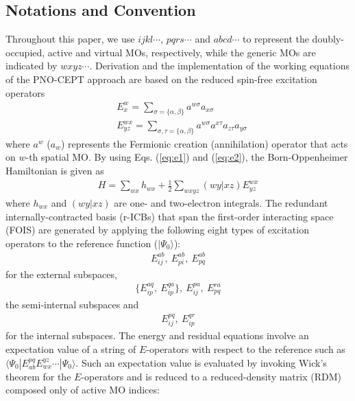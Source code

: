 \documentclass[aip,jcp,amsmath,twocolumn,floatfix,reprint,fleqn]{revtex4-1}
\begin{document}
\subsection{Notations and Convention}
%
Throughout this paper, we use $ijkl\cdots$, $pqrs\cdots$ and $abcd\cdots$ to represent the doubly-occupied, active and virtual MOs, respectively, while the generic MOs are indicated by $wxyz\cdots$.
%
Derivation and the implementation of the working equations of the PNO-CEPT approach are based on the reduced spin-free excitation operators\cite{PhysRevA.43.3392,PhysRevA.41.2391,doi:10.1063/1.448859,Kutzelnigg_Mukherjee1997}
%
\begin{align}
  &E^w_x = \sum_{\sigma=\{\alpha,\beta\}} a^{w\sigma}a_{x\sigma} \label{eq:e1} \\
  &E^{wx}_{yz} = \sum_{\sigma,\tau=\{\alpha,\beta\}} a^{w\sigma}a^{x\tau}a_{z\tau}a_{y\sigma} \label{eq:e2}
\end{align}
%
where $a^{w}$ ($a_w$) represents the Fermionic creation (annihilation) operator that acts on $w$-th spatial MO.
%
By using Eqs. (\ref{eq:e1}) and (\ref{eq:e2}), the Born-Oppenheimer Hamiltonian is given as
\begin{align}
  H=\sum_{wx} h_{wx} + \frac{1}{2}\sum_{wxyz} (wy|xz) E^{wx}_{yz}
\end{align}
%
where $h_{wx}$ and $(wy|xz)$ are one- and two-electron integrals.
%
The redundant internally-contracted basis (r-ICBs) that span the first-order interacting space (FOIS) are generated by applying the following eight types of excitation operators to the reference function ($|\Psi_0\rangle$):
%
\begin{align}
  E_{ij}^{ab},\ E_{pi}^{ab},\ E_{pq}^{ab} \label{eq:externalICB}
\end{align}
%
for the external subspaces,
%
\begin{align}
  \{E_{ip}^{aq},\ E_{ip}^{qa}\},\ E_{ij}^{pa},\ E_{pq}^{ra} \label{eq:semiinternalICB}
\end{align}
%
the semi-internal subspaces and
%
\begin{align}
  E_{ij}^{pq},\ E_{ip}^{qr} \label{eq:intternalICB}
\end{align}
%
for the internal subspaces.
%
The energy and residual equations involve an expectation value of a string of $E$-operators with respect to the reference such as $\langle\Psi_0|E^{pq}_{ab}E_{wx}^{yz}\cdots|\Psi_0\rangle$.
%
Such an expectation value is evaluated by invoking Wick's theorem for the $E$-operators and is reduced to a reduced-density matrix (RDM) composed only of active MO indices:
\end{document}
